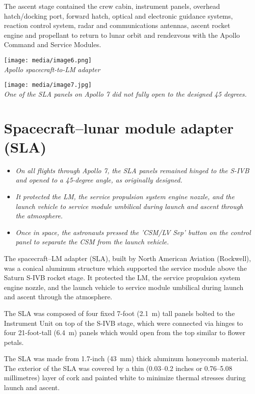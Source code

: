 The ascent stage contained the crew cabin, instrument panels, overhead
hatch/docking port, forward hatch, optical and electronic guidance
systems, reaction control system, radar and communications antennas,
ascent rocket engine and propellant to return to lunar orbit and
rendezvous with the Apollo Command and Service Modules.

\texttt{[image: media/image6.png]}\\
\emph{Apollo spacecraft-to-LM adapter}

\texttt{[image: media/image7.jpg]}\\
\emph{One of the SLA panels on Apollo 7 did not fully open to the
designed 45 degrees.}

\section{Spacecraft--lunar module adapter
(SLA)}\label{spacecraftlunar-module-adapter-sla}

\begin{itemize}
\item
  \emph{On all flights through Apollo 7, the SLA panels remained hinged
  to the S-IVB and opened to a 45-degree angle, as originally designed.}
\item
  \emph{It protected the LM, the service propulsion system engine
  nozzle, and the launch vehicle to service module umbilical during
  launch and ascent through the atmosphere.}
\item
  \emph{Once in space, the astronauts pressed the 'CSM/LV Sep' button on
  the control panel to separate the CSM from the launch vehicle.}
\end{itemize}

The spacecraft--LM adapter (SLA), built by North American Aviation
(Rockwell), was a conical aluminum structure which supported the service
module above the Saturn S-IVB rocket stage. It protected the LM, the
service propulsion system engine nozzle, and the launch vehicle to
service module umbilical during launch and ascent through the
atmosphere.

The SLA was composed of four fixed 7-foot (2.1~m) tall panels bolted to
the Instrument Unit on top of the S-IVB stage, which were connected via
hinges to four 21-foot-tall (6.4~m) panels which would open from the top
similar to flower petals.

The SLA was made from 1.7-inch (43~mm) thick aluminum honeycomb
material. The exterior of the SLA was covered by a thin (0.03--0.2
inches or 0.76--5.08 millimetres) layer of cork and painted white to
minimize thermal stresses during launch and ascent.

